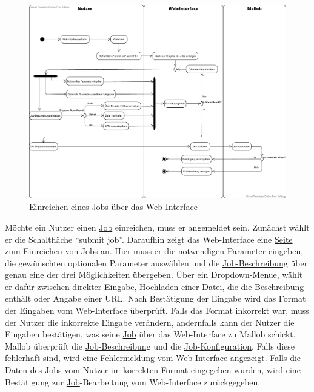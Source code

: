 \begin{figure}[H]
    \centering
    \includegraphics[width=\textwidth]{images-interface/v3_aktivitaetsdiagramme/Job_einreichen_v11.pdf}
    \caption{Einreichen eines \hyperref[B:Jobs]{Jobs} über das \gls{Web-Interface}}
\end{figure}
Möchte ein \gls{Nutzer} einen \hyperref[B:Jobs]{Job} einreichen, muss er angemeldet sein. Zunächst wählt er die Schaltfläche \enquote{submit job}. Daraufhin zeigt das \gls{Web-Interface} eine \hyperref[pages:submit-job]{Seite zum Einreichen von Jobs} an. Hier muss er die notwendigen Parameter eingeben, die gewünschten optionalen Parameter auswählen und die \hyperref[B:Job-Beschreibung]{Job-Beschreibung} über genau eine der drei Möglichkeiten übergeben. Über ein \gls{Dropdown-Menue}, wählt er dafür zwischen direkter Eingabe, Hochladen einer Datei, die die Beschreibung enthält oder Angabe einer \gls{URL}. Nach Bestätigung der Eingabe wird das Format der Eingaben vom \gls{Web-Interface} überprüft. Falls das Format inkorrekt war, muss der \gls{Nutzer} die inkorrekte Eingabe verändern, andernfalls kann der \gls{Nutzer} die Eingaben bestätigen, was seine \hyperref[B:Jobs]{Job} über das \gls{Web-Interface} zu \gls{Mallob} schickt. \gls{Mallob} überprüft die \hyperref[B:Job-Beschreibung]{Job-Beschreibung} und die \hyperref[B:Job-Konfiguration]{Job-Konfiguration}. Falls diese fehlerhaft sind, wird eine Fehlermeldung vom \gls{Web-Interface} angezeigt. Falls die Daten des \hyperref[B:Jobs]{Jobs} vom \gls{Nutzer} im korrekten Format eingegeben wurden, wird eine Bestätigung zur \hyperref[B:Jobs]{Job}-Bearbeitung vom \gls{Web-Interface} zurückgegeben.


